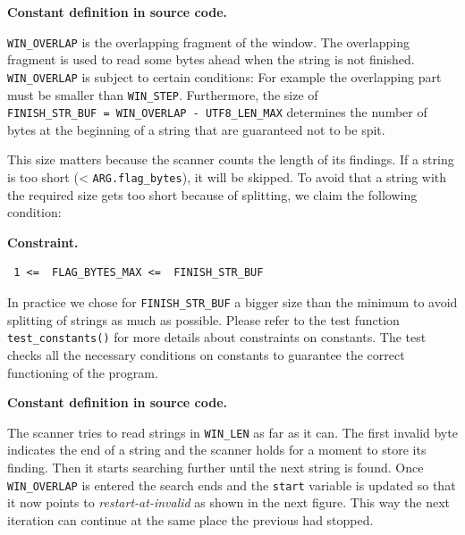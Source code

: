 \textbf{Constant definition in source code.}

\begin{Shaded}
\begin{Highlighting}[]
      
\end{Highlighting}
\end{Shaded}

\texttt{WIN\_OVERLAP} is the overlapping fragment of the window. The
overlapping fragment is used to read some bytes ahead when the string is
not finished. \texttt{WIN\_OVERLAP} is subject to certain conditions:
For example the overlapping part must be smaller than
\texttt{WIN\_STEP}. Furthermore, the size of
\texttt{FINISH\_STR\_BUF\ =\ WIN\_OVERLAP\ -\ UTF8\_LEN\_MAX} determines
the number of bytes at the beginning of a string that are guaranteed not
to be spit.

This size matters because the scanner counts the length of its findings.
If a string is too short (\textless{} \texttt{ARG.flag\_bytes}), it will
be skipped. To avoid that a string with the required size gets too short
because of splitting, we claim the following condition:

\textbf{Constraint.}

\begin{verbatim}
 1 <=  FLAG_BYTES_MAX <=  FINISH_STR_BUF
\end{verbatim}

In practice we chose for \texttt{FINISH\_STR\_BUF} a bigger size than
the minimum to avoid splitting of strings as much as possible. Please
refer to the test function \texttt{test\_constants()} for more details
about constraints on constants. The test checks all the necessary
conditions on constants to guarantee the correct functioning of the
program.

\textbf{Constant definition in source code.}

\begin{Shaded}
\begin{Highlighting}[]
      \NormalTok{= }\NormalTok{;}
\end{Highlighting}
\end{Shaded}

The scanner tries to read strings in \texttt{WIN\_LEN} as far as it can.
The first invalid byte indicates the end of a string and the scanner
holds for a moment to store its finding. Then it starts searching
further until the next string is found. Once \texttt{WIN\_OVERLAP} is
entered the search ends and the \texttt{start} variable is updated so
that it now points to \emph{restart-at-invalid} as shown in the next
figure. This way the next iteration can continue at the same place the
previous had stopped.

